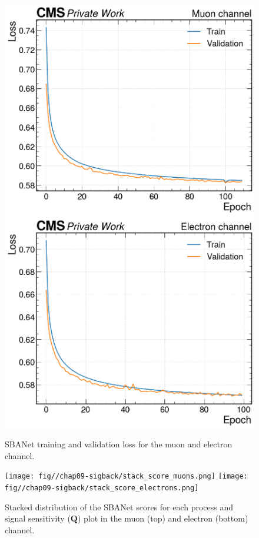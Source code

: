 \begin{figure}[H]
    \centering
    \includegraphics[height=0.48\textheight]{fig//chap09-sigback/loss_Muon.png}
    \includegraphics[height=0.48\textheight]{fig//chap09-sigback/loss_Electron.png}
    \caption{SBANet training and validation loss for the muon and electron channel.}
    \label{fig:SBANET_loss}
\end{figure}


\begin{figure}[H]
    \centering
    \texttt{[image: fig//chap09-sigback/stack\_score\_muons.png]}
    \texttt{[image: fig//chap09-sigback/stack\_score\_electrons.png]}
    \caption{Stacked distribution of the SBANet scores for each process and signal sensitivity ($\bm{Q}$) plot in the muon (top) and electron (bottom) channel.}
    \label{fig:SBANET_scores}
\end{figure}


